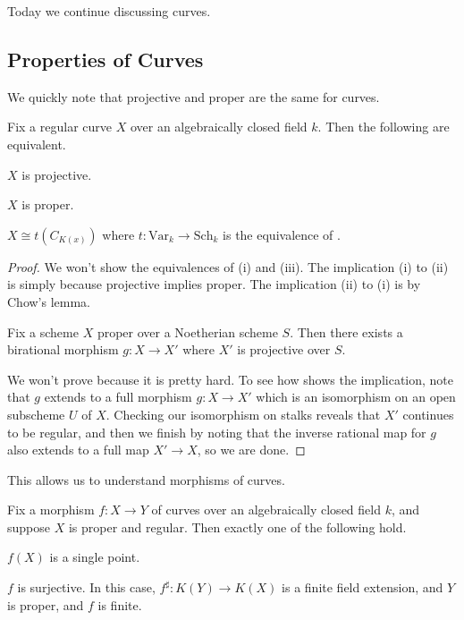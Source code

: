 \documentclass[../notes.tex]{subfiles}
\begin{document}
Today we continue discussing curves.

\subsection{Properties of Curves}
We quickly note that projective and proper are the same for curves.
\begin{proposition}
	Fix a regular curve $X$ over an algebraically closed field $k$. Then the following are equivalent.
	\begin{listroman}
		\item $X$ is projective.
		\item $X$ is proper.
		\item $X\cong t(C_{K(x)})$ where $t\colon\mathrm{Var}_k\to\mathrm{Sch}_k$ is the equivalence of \cite[Proposition~2.6]{hartshorne}.
	\end{listroman}
\end{proposition}
\begin{proof}
	We won't show the equivalences of (i) and (iii). The implication (i) to (ii) is simply because projective implies proper. The implication (ii) to (i) is by Chow's lemma.
	\begin{lemma}[Chow] \label{lem:chow}
		Fix a scheme $X$ proper over a Noetherian scheme $S$. Then there exists a birational morphism $g\colon X\to X'$ where $X'$ is projective over $S$.
	\end{lemma}
	We won't prove  because it is pretty hard. To see how  shows the implication, note that $g$ extends to a full morphism $g\colon X\to X'$ which is an isomorphism on an open subscheme $U$ of $X$. Checking our isomorphism on stalks reveals that $X'$ continues to be regular, and then we finish by noting that the inverse rational map for $g$ also extends to a full map $X'\to X$, so we are done.
\end{proof}
This allows us to understand morphisms of curves.
\begin{proposition} \label{prop:curve-maps}
	Fix a morphism $f\colon X\to Y$ of curves over an algebraically closed field $k$, and suppose $X$ is proper and regular. Then exactly one of the following hold.
	\begin{listroman}
		\item $f(X)$ is a single point.
		\item $f$ is surjective. In this case, $f^\sharp\colon K(Y)\to K(X)$ is a finite field extension, and $Y$ is proper, and $f$ is finite.
	\end{listroman}
\end{proposition}
\end{document}
